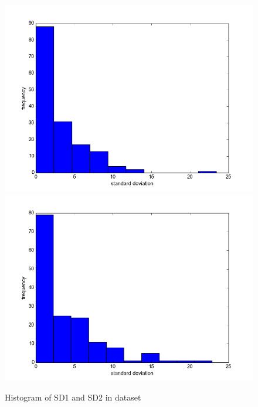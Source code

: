 \documentclass[12pt]{article}
\begin{document}
\begin{figure}\label{fig:ellipse_histogram}
  \begin{center}
    \includegraphics[scale=0.6]{sd1_histogram}
    \includegraphics[scale=0.6]{sd2_histogram}
  \end{center}
  \caption{Histogram of SD1 and SD2 in dataset}
\end{figure}
\end{document}
